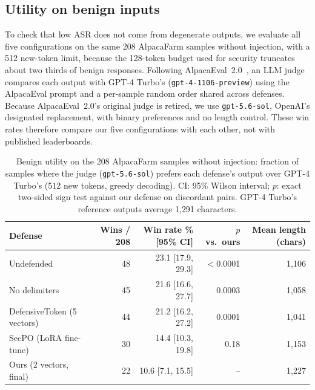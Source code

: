\documentclass{article}
\begin{document}
\subsection{Utility on benign inputs}
\label{sec:utility}

To check that low ASR does not come from degenerate outputs, we evaluate all five configurations on the same 208 AlpacaFarm samples without injection, with a 512 new-token limit, because the 128-token budget used for security truncates about two thirds of benign responses. Following AlpacaEval~2.0~\cite{li2023alpacaeval,dubois2024lcalpacaeval}, an LLM judge compares each output with GPT-4 Turbo's (\texttt{gpt-4-1106-preview}) using the AlpacaEval prompt and a per-sample random order shared across defenses. Because AlpacaEval~2.0's original judge is retired, we use \texttt{gpt-5.6-sol}, OpenAI's designated replacement, with binary preferences and no length control. These win rates therefore compare our five configurations with each other, not with published leaderboards.

\begin{table}[t]
  \caption{Benign utility on the 208 AlpacaFarm samples without injection: fraction of samples where the judge (\texttt{gpt-5.6-sol}) prefers each defense's output over GPT-4 Turbo's (512 new tokens, greedy decoding). CI: 95\% Wilson interval; $p$: exact two-sided sign test against our defense on discordant pairs. GPT-4 Turbo's reference outputs average 1{,}291 characters.}
  \label{tab:utility}
  \centering
  \small
  \begin{tabular}{lrrrr}
    \toprule
    Defense & Wins / 208 & Win rate \% [95\% CI] & $p$ vs.\ ours & Mean length (chars) \\
    \midrule
    Undefended & 48 & 23.1 [17.9, 29.3] & $<$0.0001 & 1{,}106 \\
    No delimiters & 45 & 21.6 [16.6, 27.7] & 0.0003 & 1{,}058 \\
    DefensiveToken (5 vectors) & 44 & 21.2 [16.2, 27.2] & 0.0001 & 1{,}041 \\
    SecPO (LoRA fine-tune) & 30 & 14.4 [10.3, 19.8] & 0.18 & 1{,}153 \\
    Ours (2 vectors, final) & 22 & 10.6 [7.1, 15.5] & -- & 1{,}227 \\
    \bottomrule
  \end{tabular}
\end{table}
\end{document}
